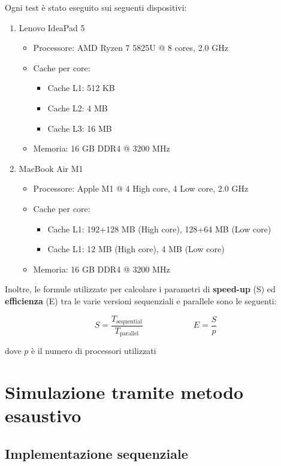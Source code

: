\documentclass[12pt]{report}
\begin{document}
    Ogni test è stato eseguito sui seguenti dispositivi:
    \begin{enumerate}
        \item Lenovo IdeaPad 5
        \begin{itemize}
            \item Processore: AMD Ryzen 7 5825U @ 8 cores, 2.0 GHz
            \item Cache per core:
            \begin{itemize}
                \item Cache L1: 512 KB
                \item Cache L2: 4 MB
                \item Cache L3: 16 MB
            \end{itemize}
            \item Memoria: 16 GB DDR4 @ 3200 MHz
        \end{itemize}
        \item MacBook Air M1
        \begin{itemize}
            \item Processore: Apple M1 @ 4 High core, 4 Low core, 2.0 GHz
            \item Cache per core:
            \begin{itemize}
                \item Cache L1: 192+128 MB (High core), 128+64 MB (Low core)
                \item Cache L1: 12 MB (High core), 4 MB (Low core)
            \end{itemize}
            \item Memoria: 16 GB DDR4 @ 3200 MHz
        \end{itemize}
    \end{enumerate}

    Inoltre, le formule utilizzate per calcolare i parametri di \textbf{speed-up} (S) ed \textbf{efficienza} (E) tra le varie versioni sequenziali e parallele sono le seguenti:

    \[S = \frac{T_\text{sequential}}{T_\text{parallel}} \qquad\qquad\qquad E = \frac{S}{p}\]

    dove $p$ è il numero di processori utilizzati

    \chapter{Simulazione tramite metodo esaustivo}

    \section{Implementazione sequenziale}
\end{document}
